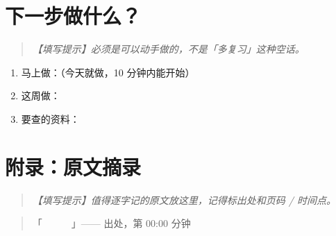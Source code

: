 \section{下一步做什么？}

\begin{quote}
\itshape
【填写提示】必须是可以动手做的，不是「多复习」这种空话。
\end{quote}

\begin{enumerate}[label=(\arabic*), leftmargin=*, itemsep=0.3em]
  \item 马上做：（今天就做，10 分钟内能开始）
  \item 这周做：
  \item 要查的资料：
\end{enumerate}


\section*{附录：原文摘录}

\begin{quote}
\itshape
【填写提示】值得逐字记的原文放这里，记得标出处和页码 / 时间点。
\end{quote}

\begin{quote}
「　　　」—— 出处，第 00:00 分钟
\end{quote}


